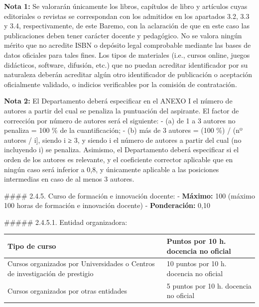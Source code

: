 \documentclass{article}
\begin{document}
\begin{itemize}
\begin{itemize}
\begin{scriptsize}
                  \textbf{Nota 1:} Se valorarán únicamente los libros, capítulos de libro y artículos cuyas editoriales o revistas se correspondan con los admitidos en los apartados 3.2, 3.3 y 3.4, respectivamente, de este Baremo, con la aclaración de que en este caso las publicaciones deben tener carácter docente y pedagógico. No se valora ningún mérito que no acredite ISBN o depósito legal comprobable mediante las bases de datos oficiales para tales fines. Los tipos de materiales (i.e., cursos online, juegos didácticos, software, difusión, etc.) que no puedan acreditar identificador por su naturaleza deberán acreditar algún otro identificador de publicación o aceptación oficialmente validado, o indicios verificables por la comisión de contratación.

                  \textbf{Nota 2:} El Departamento deberá especificar en el ANEXO I el número de autores a partir del cual se penaliza la puntuación del aspirante. El factor de corrección por número de autores será el siguiente:
                  - (a) de 1 a 3 autores no penaliza = 100 \% de la cuantificación;
                  - (b) más de 3 autores = (100 \%) / (nº autores / i], siendo i ≥ 3, y siendo i el número de autores a partir del cual (no incluyendo i) se penaliza. Asimismo, el Departamento deberá especificar si el orden de los autores es relevante, y el coeficiente corrector aplicable que en ningún caso será inferior a 0,8, y únicamente aplicable a las posiciones intermedias en caso de al menos 3 autores.

                  \#\#\#\# 2.4.5. Curso de formación e innovación docente:
                  - \textbf{Máximo:} 100 (máximo 100 horas de formación e innovación docente)
                  - \textbf{Ponderación:} 0,10

                  \#\#\#\#\# 2.4.5.1. Entidad organizadora:
                  \vspace{0.4cm}
                  \begin{table}[h!]\centering\renewcommand{\arraystretch}{1.3}
                    \begin{tabular}{|p{}|p{}|}\hline
                      Tipo de curso                                                                & Puntos por 10 h. docencia no oficial    \\\hline
                      Cursos organizados por Universidades o Centros de investigación de prestigio & 10 puntos por 10 h. docencia no oficial \\\hline
                      Cursos organizados por otras entidades                                       & 5 puntos por 10 h. docencia no oficial  \\\hline
                    \end{tabular}\end{table}
                  \vspace{0.4cm}


\end{scriptsize}
\end{itemize}
\end{itemize}
\end{document}
